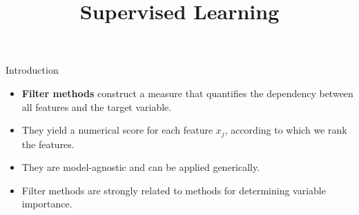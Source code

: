 \documentclass[11pt,compress,t,notes=noshow, xcolor=table]{beamer}
\title{Supervised Learning}
\date{}
\begin{document}

  \begin{vbframe}{Introduction}
  \vspace{0.4cm}
  \begin{itemize}
  \setlength{\itemsep}{1.5em}
    \item \textbf{Filter methods} construct a measure that quantifies the dependency between all features and the target variable.
    \item They yield a numerical score for each feature $x_j$, according to which we rank the features.
    \item They are model-agnostic and can be applied generically.
    \item Filter methods are strongly related to methods for determining variable importance.
  \end{itemize}
  \end{vbframe}
\end{document}
